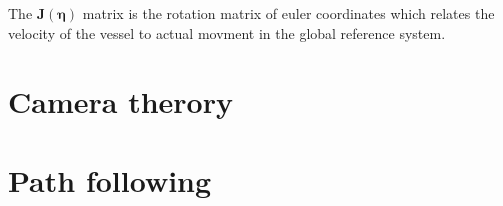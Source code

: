 	The $\mathbf{J}(\mathbf{\eta})$ matrix is the rotation matrix of euler coordinates which relates the velocity of the vessel to actual movment in the global reference system.




\section{Camera therory}



\section{Path following}

